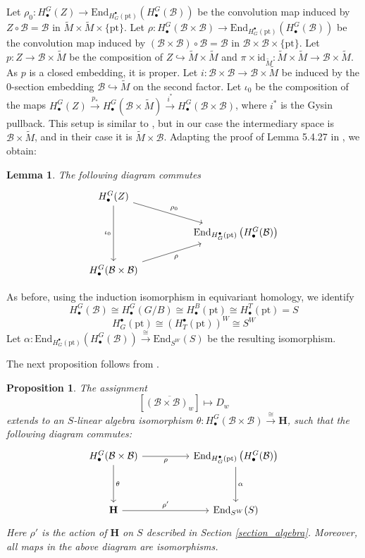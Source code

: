 \documentclass[11pt]{article}
\newcommand{\B}{\mathcal{B}}
\renewcommand{\H}{\textbf{H}}
\newcommand{\1}{\mathbb{1}}
\newcommand{\HBM}[2]{H_\bullet^{#1}(#2)}
\newcommand{\tM}{\widetilde{M}}
\newcommand{\End}{\text{End}}
\newcommand{\pt}{\text{pt}}
\newtheorem{lemma}[theorem]{Lemma}
\newtheorem{proposition}[theorem]{Proposition}
\theoremstyle{definition}
\numberwithin{equation}{section}
\begin{document}
Let $\rho_0 : \HBM{G}{Z} \rightarrow \End_{H_G^\bullet(\pt)} \left( \HBM{G}{\B}\right)$ be the convolution map induced by $Z\circ \B = \B$ in $\tM \times \tM \times \{ \pt \}$. Let $\rho : \HBM{G}{\B\times\B}\rightarrow \End_{H_G^\bullet(\pt)} \left( \HBM{G}{\B}\right)$ be the convolution map induced by $(\B\times \B)\circ \B = \B$ in $\B \times \B \times \{ \pt \}$. Let $p:Z\rightarrow \B\times\tM$ be the composition of $Z\hookrightarrow \tM\times\tM$ and $\pi\times\text{id}_{\tM} : \tM\times\tM \rightarrow\B\times\tM$. As $p$ is a closed embedding, it is proper. Let $i : \B\times\B \rightarrow \B\times\tM$ be induced by the $0$-section embedding $\B\hookrightarrow \tM$ on the second factor. Let $\iota_0$ be the composition of the maps $\HBM{G}{Z} \xrightarrow{p_*} \HBM{G}{\B\times\tM} \xrightarrow{i^*} \HBM{G}{\B\times\B}$, where $i^*$ is the Gysin pullback. This setup is similar to \cite[.22]{CG}, but in our case the intermediary space is $\B\times\tM$, and in their case it is $\tM \times \B$. Adapting the proof of Lemma 5.4.27 in \cite{CG}, we obtain:

\begin{lemma}
\label{finite_map_to_H0}
    The following diagram commutes
    \[\begin{tikzcd}
	\HBM{G}{Z} \\
	&&  \End_{H_G^\bullet(\pt)} \left( \HBM{G}{\B}\right) \\
	\HBM{G}{\B\times\B}
	\arrow["\rho_0", from=1-1, to=2-3]
	\arrow["\iota_0"', from=1-1, to=3-1]
	\arrow["\rho"', from=3-1, to=2-3]
\end{tikzcd}\]
\end{lemma}

As before, using the induction isomorphism in equivariant homology, we identify $$\HBM{G}{\B} \cong \HBM{G}{G/B} \cong \HBM{B}{\pt} \cong \HBM{T}{\pt} = S$$ $$H_G^\bullet(\pt) \cong \left( H_T^\bullet(\pt) \right)^W \cong S^W$$ Let $\alpha:\End_{H_G^\bullet(\pt)} \left( \HBM{G}{\B}\right) \xrightarrow{\cong} \End_{S^W}(S)$ be the resulting isomorphism. 

The next proposition follows from \cite{KK1}.

\begin{proposition}
\label{finite_H_0_thm}
The assignment
$$\left[ \overline{(\B\times\B)_w} \right] \mapsto D_w$$
extends to an $S$-linear algebra isomorphism $\theta : \HBM{G}{\B\times \B} \xrightarrow{\cong}\H$, such that the following diagram commutes:
    \[\begin{tikzcd}
	\HBM{G}{\B\times\B} && \End_{H_G^\bullet(\pt)} \left( \HBM{G}{\B}\right) \\
	\\
	\H && \End_{S^W}(S)
	\arrow["\rho"', from=1-1, to=1-3]
	\arrow["\theta", from=1-1, to=3-1]
	\arrow["\alpha", from=1-3, to=3-3]
	\arrow["\rho'",from=3-1, to=3-3]
\end{tikzcd}\]
    Here $\rho'$ is the action of $\H$ on $S$ described in Section \ref{section_algebra}. Moreover, all maps in the above diagram are isomorphisms.
\end{proposition}
\end{document}
